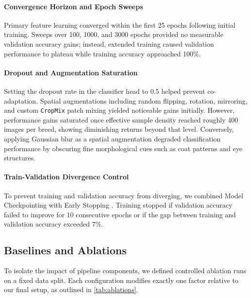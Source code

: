 \paragraph{Convergence Horizon and Epoch Sweeps}
Primary feature learning converged within the first 25 epochs following initial training. Sweeps over 100, 1000, and 3000 epochs provided no measurable validation accuracy gains; instead, extended training caused validation performance to plateau while training accuracy approached 100\%.

\paragraph{Dropout and Augmentation Saturation}
Setting the dropout rate in the classifier head to 0.5 helped prevent co-adaptation. Spatial augmentations including random flipping, rotation, mirroring, and custom \texttt{CropMix} patch mixing \cite{yun2019cutmix} yielded noticeable gains initially. However, performance gains saturated once effective sample density reached roughly 400 images per breed, showing diminishing returns beyond that level. Conversely, applying Gaussian blur as a spatial augmentation degraded classification performance by obscuring fine morphological cues such as coat patterns and eye structures.

\paragraph{Train-Validation Divergence Control}
To prevent training and validation accuracy from diverging, we combined Model Checkpointing with Early Stopping \cite{prechelt1998early}. Training stopped if validation accuracy failed to improve for 10 consecutive epochs or if the gap between training and validation accuracy exceeded 7\%.

\subsection{Baselines and Ablations}
\label{subsec:baselines}

To isolate the impact of pipeline components, we defined controlled ablation runs on a fixed data split. Each configuration modifies exactly one factor relative to our final setup, as outlined in \cref{tab:ablations}.

